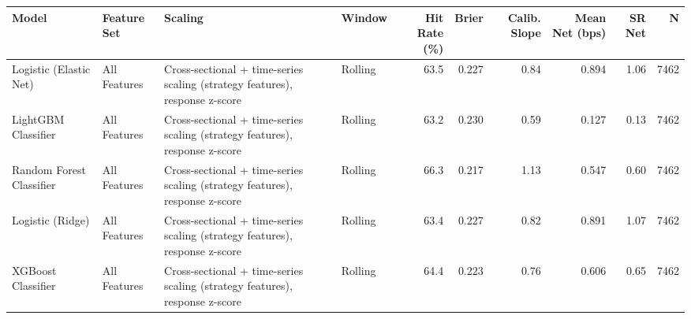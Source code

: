 \begin{tabular}{llllrrrrrr}
\toprule
Model & Feature Set & Scaling & Window & Hit Rate (\%) & Brier & Calib. Slope & Mean Net (bps) & SR Net & N \\
\midrule
Logistic (Elastic Net) & All Features & Cross-sectional + time-series scaling (strategy features), response z-score & Rolling & 63.5 & 0.227 & 0.84 & 0.894 & 1.06 & 7462 \\
LightGBM Classifier & All Features & Cross-sectional + time-series scaling (strategy features), response z-score & Rolling & 63.2 & 0.230 & 0.59 & 0.127 & 0.13 & 7462 \\
Random Forest Classifier & All Features & Cross-sectional + time-series scaling (strategy features), response z-score & Rolling & 66.3 & 0.217 & 1.13 & 0.547 & 0.60 & 7462 \\
Logistic (Ridge) & All Features & Cross-sectional + time-series scaling (strategy features), response z-score & Rolling & 63.4 & 0.227 & 0.82 & 0.891 & 1.07 & 7462 \\
XGBoost Classifier & All Features & Cross-sectional + time-series scaling (strategy features), response z-score & Rolling & 64.4 & 0.223 & 0.76 & 0.606 & 0.65 & 7462 \\
\bottomrule
\end{tabular}
